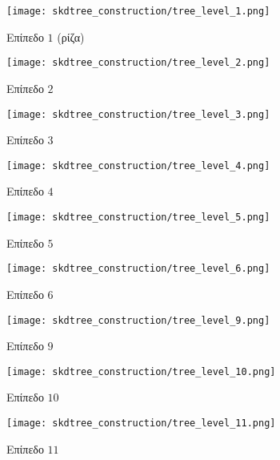 \begin{figure}[h]
    \begin{subfigure}{0.5\textwidth}
        \centering
        \texttt{[image: skdtree\_construction/tree\_level\_1.png]}
        \caption{Επίπεδο $1$ (ρίζα)}        
    \end{subfigure}
    \begin{subfigure}{0.5\textwidth}
        \centering
        \texttt{[image: skdtree\_construction/tree\_level\_2.png]}
        \caption{Επίπεδο $2$}        
    \end{subfigure}
    \begin{subfigure}{0.5\textwidth}
        \centering
        \texttt{[image: skdtree\_construction/tree\_level\_3.png]}
        \caption{Επίπεδο $3$}        
    \end{subfigure}
    \begin{subfigure}{0.5\textwidth}
        \centering
        \texttt{[image: skdtree\_construction/tree\_level\_4.png]}
        \caption{Επίπεδο $4$}        
    \end{subfigure}
    \begin{subfigure}{0.5\textwidth}
        \centering
        \texttt{[image: skdtree\_construction/tree\_level\_5.png]}
        \caption{Επίπεδο $5$}        
    \end{subfigure}
    \begin{subfigure}{0.5\textwidth}
        \centering
        \texttt{[image: skdtree\_construction/tree\_level\_6.png]}
        \caption{Επίπεδο $6$}        
    \end{subfigure}
    \begin{subfigure}{0.5\textwidth}
        \centering
        \texttt{[image: skdtree\_construction/tree\_level\_9.png]}
        \caption{Επίπεδο $9$}        
    \end{subfigure}
    \begin{subfigure}{0.5\textwidth}
        \centering
        \texttt{[image: skdtree\_construction/tree\_level\_10.png]}
        \caption{Επίπεδο $10$}        
    \end{subfigure}
    \begin{subfigure}{0.5\textwidth}
        \centering
        \texttt{[image: skdtree\_construction/tree\_level\_11.png]}
        \caption{Επίπεδο $11$}        
    \end{subfigure}
    \begin{subfigure}{0.5\textwidth}

\end{subfigure}
\end{figure}
